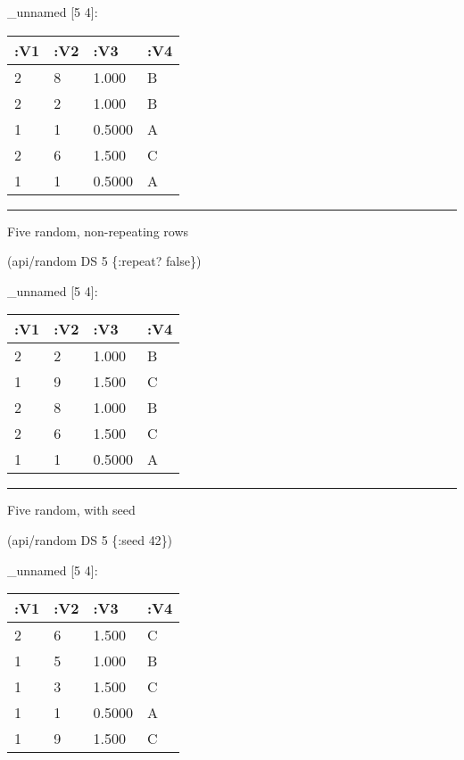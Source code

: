 \documentclass[]{article}
\newenvironment{Shaded}{\begin{snugshade}}{\end{snugshade}}
\newcommand{\DecValTok}[1]{\textcolor[rgb]{0.00,0.00,0.81}{#1}}
\newcommand{\VariableTok}[1]{\textcolor[rgb]{0.00,0.00,0.00}{#1}}
\newcommand{\AttributeTok}[1]{\textcolor[rgb]{0.77,0.63,0.00}{#1}}
\newcommand{\NormalTok}[1]{#1}
\begin{document}
\_unnamed {[}5 4{]}:

\begin{longtable}[]{@{}llll@{}}
\toprule
:V1 & :V2 & :V3 & :V4\tabularnewline
\midrule
\endhead
2 & 8 & 1.000 & B\tabularnewline
2 & 2 & 1.000 & B\tabularnewline
1 & 1 & 0.5000 & A\tabularnewline
2 & 6 & 1.500 & C\tabularnewline
1 & 1 & 0.5000 & A\tabularnewline
\bottomrule
\end{longtable}

\begin{center}\rule{0.5\linewidth}{0.5pt}\end{center}

Five random, non-repeating rows

\begin{Shaded}
\begin{Highlighting}[]
\NormalTok{(api/random DS }\DecValTok{5}\NormalTok{ \{}\AttributeTok{:repeat}\NormalTok{? }\VariableTok{false}\NormalTok{\})}
\end{Highlighting}
\end{Shaded}

\_unnamed {[}5 4{]}:

\begin{longtable}[]{@{}llll@{}}
\toprule
:V1 & :V2 & :V3 & :V4\tabularnewline
\midrule
\endhead
2 & 2 & 1.000 & B\tabularnewline
1 & 9 & 1.500 & C\tabularnewline
2 & 8 & 1.000 & B\tabularnewline
2 & 6 & 1.500 & C\tabularnewline
1 & 1 & 0.5000 & A\tabularnewline
\bottomrule
\end{longtable}

\begin{center}\rule{0.5\linewidth}{0.5pt}\end{center}

Five random, with seed

\begin{Shaded}
\begin{Highlighting}[]
\NormalTok{(api/random DS }\DecValTok{5}\NormalTok{ \{}\AttributeTok{:seed} \DecValTok{42}\NormalTok{\})}
\end{Highlighting}
\end{Shaded}

\_unnamed {[}5 4{]}:

\begin{longtable}[]{@{}llll@{}}
\toprule
:V1 & :V2 & :V3 & :V4\tabularnewline
\midrule
\endhead
2 & 6 & 1.500 & C\tabularnewline
1 & 5 & 1.000 & B\tabularnewline
1 & 3 & 1.500 & C\tabularnewline
1 & 1 & 0.5000 & A\tabularnewline
1 & 9 & 1.500 & C\tabularnewline
\bottomrule
\end{longtable}
\end{document}
